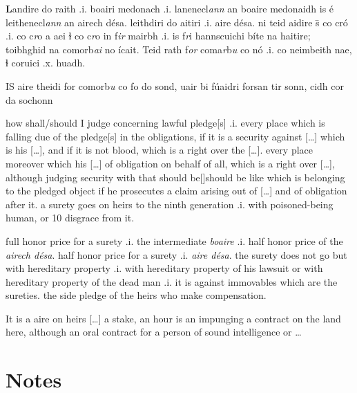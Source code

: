 \documentclass[11pt]{article}
\begin{document}
\begin{pages}
\begin{Leftside}
    \pstart
    \textbf{L}andire do raith .i. boairi medonach .i. lanenecl\emph{ann} an boaire medonaidh is \'{e} leithenecl\emph{ann} an airech d\'{e}sa. leithdiri do aitiri .i. aire d\'{e}sa. ni teid aidire \={s} co cr\'{o} .i. co c\emph{r}o a aei ɫ co c\emph{r}o in f\emph{ir} mairbh .i. is f\emph{r}i hannscuichi b\'{i}te na haitire; toibhghid na comorb\emph{ai} no \'{i}cait. Teid rath f\emph{or} coma\emph{r}b\emph{u} co  n\'{o} .i. co neimbeith nae, ɫ coruici .x. huadh.
    \pend
    
    \pstart
    IS aire theidi for comorb\emph{u} co fo do sond, uair bi f\'{u}aidri forsan tir sonn, cidh cor da sochonn  
    \pend
    \endnumbering
  \end{Leftside}

\begin{Rightside}
    \beginnumbering
   \pstart
   how shall/should I judge concerning lawful pledge[s] .i. every place which is falling due of the pledge[s] in the obligations, if it is a security against [\ldots] which is his [\ldots], and if it is not blood, which is a right over the [\ldots]. every place moreover which his [\ldots] of obligation on behalf of all, which is a right over [\ldots], although judging security with that should be[\hspace{2mm}]should be like which is belonging to the pledged object if he prosecutes a claim arising out of [\ldots] and of obligation after it.  a surety goes on heirs to the ninth generation .i. with poisoned-being human, or 10 disgrace from it.
    \pend

    \pstart
    full honor price for a surety .i. the intermediate \emph{boaire} .i. half honor price of the \emph{airech d\'{e}sa}. half honor price for a surety .i. \emph{aire d\'{e}sa}. the surety does not go but with hereditary property .i. with hereditary property of his lawsuit or with hereditary property of the dead man .i. it is against immovables which are the sureties. the side pledge of the heirs who make compensation. 
    \pend

    \pstart
    It is a aire on heirs [\ldots] a stake, an hour is an impunging a contract on the land here, although an oral contract for a person of sound intelligence or \ldots
    \pend
    \endnumbering
  \end{Rightside}
  \Pages
\end{pages}

\section{Notes}
\end{document}
